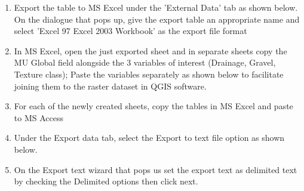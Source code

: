 \documentclass[letterpaper,10pt,english]{sphinxmanual}
\begin{document}
\begin{enumerate}
\item {} 
\sphinxAtStartPar
Export the table to MS Excel under the ’External Data’ tab as shown below. On the
dialogue that pops up, give the export table an appropriate name and select ’Excel 97 \sphinxhyphen{}
Excel 2003 Workbook’ as the export file format



\item {} 
\sphinxAtStartPar
In MS Excel, open the just exported sheet and in separate sheets copy the MU Global field
alongside the 3 variables of interest (Drainage, Gravel, Texture class); Paste the variables
separately as shown below to facilitate joining them to the raster dataset in
Q\sphinxhyphen{}GIS software.



\item {} 
\sphinxAtStartPar
For each of the newly created sheets, copy the tables in MS Excel and paste to MS Access



\item {} 
\sphinxAtStartPar
Under the Export data tab, select the Export to text file option as shown below.


\item {} 
\sphinxAtStartPar
On the Export text wizard that pops us set the export text as delimited text by checking
the Delimited options then click next.


\end{enumerate}
\end{document}
